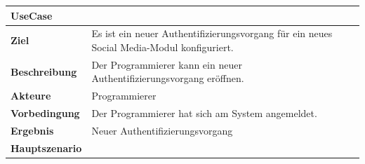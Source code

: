 \begin{longtable}[c]{@{}ll@{}}
\toprule
\begin{minipage}[b]{0.34\columnwidth}\raggedright\strut
\textbf{UseCase}
\strut\end{minipage} &
\begin{minipage}[b]{0.60\columnwidth}\raggedright\strut
\strut\end{minipage}\tabularnewline
\midrule
\endhead
\begin{minipage}[t]{0.34\columnwidth}\raggedright\strut
\textbf{Ziel}
\strut\end{minipage} &
\begin{minipage}[t]{0.60\columnwidth}\raggedright\strut
Es ist ein neuer Authentifizierungsvorgang für ein neues Social
Media-Modul konfiguriert.
\strut\end{minipage}\tabularnewline
\begin{minipage}[t]{0.34\columnwidth}\raggedright\strut
\textbf{Beschreibung}
\strut\end{minipage} &
\begin{minipage}[t]{0.60\columnwidth}\raggedright\strut
Der Programmierer kann ein neuer Authentifizierungsvorgang eröffnen.
\strut\end{minipage}\tabularnewline
\begin{minipage}[t]{0.34\columnwidth}\raggedright\strut
\textbf{Akteure}
\strut\end{minipage} &
\begin{minipage}[t]{0.60\columnwidth}\raggedright\strut
Programmierer
\strut\end{minipage}\tabularnewline
\begin{minipage}[t]{0.34\columnwidth}\raggedright\strut
\textbf{Vorbedingung}
\strut\end{minipage} &
\begin{minipage}[t]{0.60\columnwidth}\raggedright\strut
Der Programmierer hat sich am System angemeldet.
\strut\end{minipage}\tabularnewline
\begin{minipage}[t]{0.34\columnwidth}\raggedright\strut
\textbf{Ergebnis}
\strut\end{minipage} &
\begin{minipage}[t]{0.60\columnwidth}\raggedright\strut
Neuer Authentifizierungsvorgang
\strut\end{minipage}\tabularnewline
\begin{minipage}[t]{0.34\columnwidth}\raggedright\strut
\textbf{Hauptszenario}
\strut\end{minipage} &

\end{longtable}
